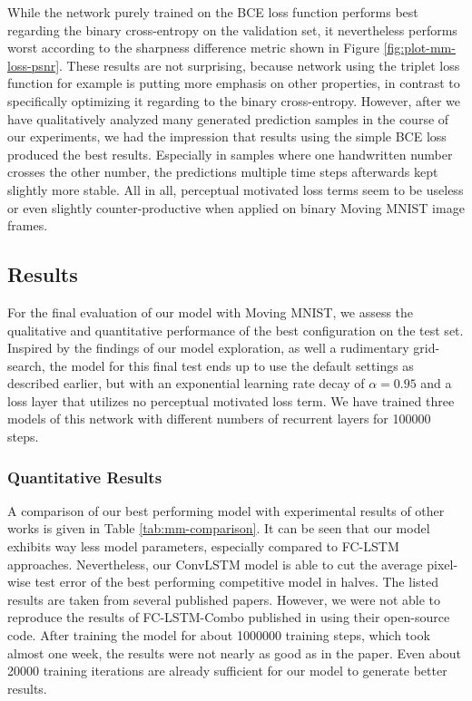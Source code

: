 While the network purely trained on the BCE loss function performs best regarding the binary cross-entropy on the validation set, it nevertheless performs worst according to the sharpness difference metric shown in Figure \ref{fig:plot-mm-loss-psnr}. These results are not surprising, because network using the triplet loss function for example is putting more emphasis on other properties, in contrast to specifically optimizing it regarding to the binary cross-entropy. However, after we have qualitatively analyzed many generated prediction samples in the course of our experiments, we had the impression that results using the simple BCE loss produced the best results. Especially in samples where one handwritten number crosses the other number, the predictions multiple time steps afterwards kept slightly more stable. All in all, perceptual motivated loss terms seem to be useless or even slightly counter-productive when applied on binary Moving MNIST image frames. 

\subsection{Results}

For the final evaluation of our model with Moving MNIST, we assess the qualitative and quantitative performance of the best configuration on the test set. Inspired by the findings of our model exploration, as well a rudimentary grid-search, the model for this final test ends up to use the default settings as described earlier, but with an exponential learning rate decay of $\alpha=0.95$ and a loss layer that utilizes no perceptual motivated loss term. We have trained three models of this network with different numbers of recurrent layers for \num{100000} steps.


\subsubsection{Quantitative Results}

A comparison of our best performing model with experimental results of other works is given in Table \ref{tab:mm-comparison}. It can be seen that our model exhibits way less model parameters, especially compared to FC-LSTM approaches. Nevertheless, our ConvLSTM model is able to cut the average pixel-wise test error of the best performing competitive model in halves. The listed results are taken from several published papers. However, we were not able to reproduce the results of FC-LSTM-Combo published in \parencite{unsup_learn_lstm} using their open-source code. After training the model for about \num{1000000} training steps, which took almost one week, the results were not nearly as good as in the paper. Even about \num{20000} training iterations are already sufficient for our model to generate better results.

